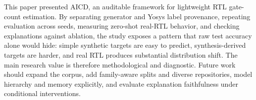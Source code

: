 \documentclass[conference]{IEEEtran}
\begin{document}
This paper presented AICD, an auditable framework for lightweight RTL gate-count estimation. By separating generator and Yosys label provenance, repeating evaluation across seeds, measuring zero-shot real-RTL behavior, and checking explanations against ablation, the study exposes a pattern that raw test accuracy alone would hide: simple synthetic targets are easy to predict, synthesis-derived targets are harder, and real RTL produces substantial distribution shift. The main research value is therefore methodological and diagnostic. Future work should expand the corpus, add family-aware splits and diverse repositories, model hierarchy and memory explicitly, and evaluate explanation faithfulness under conditional interventions.



\end{document}
